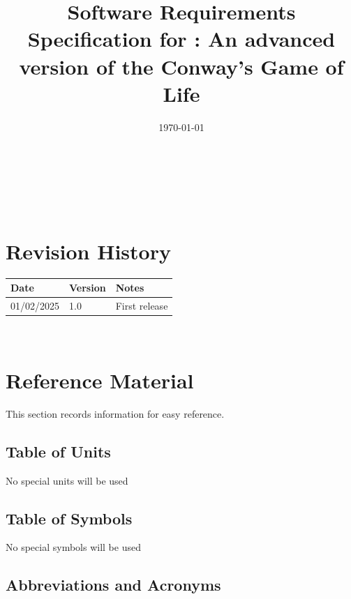 \documentclass[12pt]{article}
\begin{document}
\title{Software Requirements Specification for \progname : An advanced version of the Conway's Game of Life} 
\author{\authname}
\date{\today}
	
\maketitle

~\newpage


\tableofcontents

~\newpage

\section*{Revision History}

\begin{tabularx}{\textwidth}{p{3cm}p{2cm}X}
\toprule {\bf Date} & {\bf Version} & {\bf Notes}\\
\midrule
01/02/2025 & 1.0 & First release \\
\bottomrule
\end{tabularx}


~\newpage

\section{Reference Material}

This section records information for easy reference.

\subsection{Table of Units}

No special units will be used

\subsection{Table of Symbols}

No special symbols will be used

\subsection{Abbreviations and Acronyms}
\end{document}

